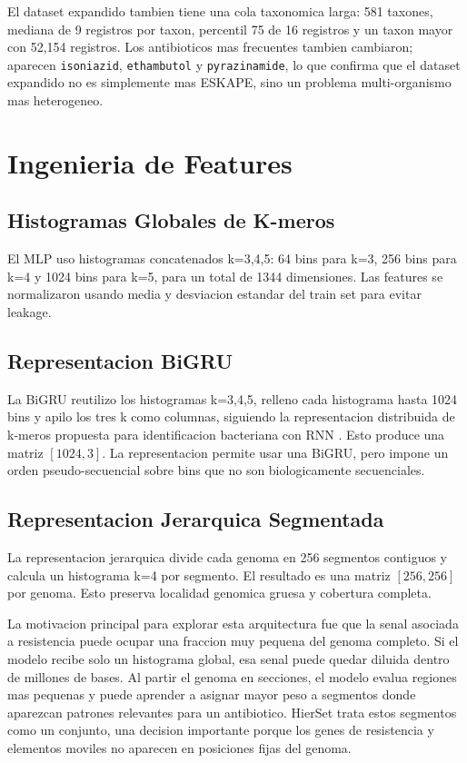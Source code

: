 \documentclass[journal,transmag]{../ieee_latex_template/IEEEtran}
\begin{document}
El dataset expandido tambien tiene una cola taxonomica larga: 581 taxones, mediana de 9 registros por taxon, percentil 75 de 16 registros y un taxon mayor con 52,154 registros. Los antibioticos mas frecuentes tambien cambiaron; aparecen \texttt{isoniazid}, \texttt{ethambutol} y \texttt{pyrazinamide}, lo que confirma que el dataset expandido no es simplemente mas ESKAPE, sino un problema multi-organismo mas heterogeneo.

\section{Ingenieria de Features}
\subsection{Histogramas Globales de K-meros}
El MLP uso histogramas concatenados k=3,4,5: 64 bins para k=3, 256 bins para k=4 y 1024 bins para k=5, para un total de 1344 dimensiones. Las features se normalizaron usando media y desviacion estandar del train set para evitar leakage.

\subsection{Representacion BiGRU}
La BiGRU reutilizo los histogramas k=3,4,5, relleno cada histograma hasta 1024 bins y apilo los tres k como columnas, siguiendo la representacion distribuida de k-meros propuesta para identificacion bacteriana con RNN \cite{lugo2021}. Esto produce una matriz $[1024,3]$. La representacion permite usar una BiGRU, pero impone un orden pseudo-secuencial sobre bins que no son biologicamente secuenciales.

\subsection{Representacion Jerarquica Segmentada}
La representacion jerarquica divide cada genoma en 256 segmentos contiguos y calcula un histograma k=4 por segmento. El resultado es una matriz $[256,256]$ por genoma. Esto preserva localidad genomica gruesa y cobertura completa.

La motivacion principal para explorar esta arquitectura fue que la senal asociada a resistencia puede ocupar una fraccion muy pequena del genoma completo. Si el modelo recibe solo un histograma global, esa senal puede quedar diluida dentro de millones de bases. Al partir el genoma en secciones, el modelo evalua regiones mas pequenas y puede aprender a asignar mayor peso a segmentos donde aparezcan patrones relevantes para un antibiotico. HierSet trata estos segmentos como un conjunto, una decision importante porque los genes de resistencia y elementos moviles no aparecen en posiciones fijas del genoma.
\end{document}
